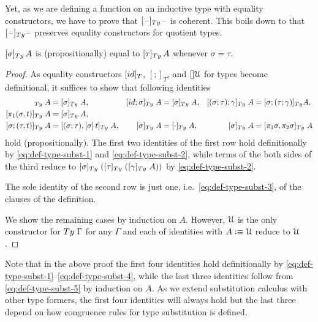 \documentclass[a4paper,UKenglish,numberwithinsect,cleveref,thm-restate]{lipics-v2021}
\newcommand{\danger}{\marginpar[\hfill\dbend]{\dbend\hfill}}
\newcommand{\LT}[2][]{\todo[inline,author={L-T},caption={},#1]{#2}}
\begin{document}
Yet, as we are defining a function on an inductive type with equality constructors, we have to prove that $[\blank]_{\Ty}\blank$ is coherent.\LT{general condition?} 
This boils down to that $[\blank]_{\Ty}\blank$ preserves equality constructors for quotient types.
\begin{proposition}[Coherence]\label{prop:coherence-1}
  $[\sigma]_{\Ty}\,A$ is (propositionally) equal to $[\tau]_{\Ty}\,A$ whenever $\sigma = \tau$.
  \danger
\end{proposition}
\begin{proof}
  As equality constructors $[\idS]_T$, $[;]_T$, and $[]\mathcal{U}$ for types become definitional, it suffices to show that following identities
  \begin{align*}
    [\sigma;\idS]_{\Ty} \;A          & = [\sigma]_{\Ty}\;A,
                                     & [\idS;\sigma]_{\Ty} \;A          & = [\sigma]_{\Ty}\;A,
                                     & [(\sigma;\tau);\gamma]_{\Ty} \;A & = [\sigma; (\tau; \gamma)]_{\Ty}A, \\
    [\pi_1(\sigma, t)]_{\Ty}\;A      & = [\sigma]_{\Ty}\;A, \\
    [\sigma; (\tau, t)]_{\Ty} \;A    & = [(\sigma;\tau), [\sigma]\, t]_{\Ty}\;A,
                                     & [\sigma]_{\Ty} \;A               & = [\emptyctx]_{\Ty}\;A,
                                     & [\sigma]_{\Ty} \;A               & = [\pi_1\sigma, \pi_2\sigma]_{\Ty}\;A
  \end{align*}
  hold (propositionally).
  The first two identities of the first row hold definitionally by \eqref{eq:def-type-subst-1} and \eqref{eq:def-type-subst-2}, while terms of the both sides of the third reduce to $[\sigma]_{\Ty}\;([\tau]_{\Ty}\;([\gamma]_{\Ty}\;A))$ by \eqref{eq:def-type-subst-2}.

  The sole identity of the second row is just one, i.e.\ \eqref{eq:def-type-subst-3}, of the clauses of the definition.

  We show the remaining cases by induction on $A$.
  However, $\mathcal{U}$ is the only constructor for $\Ty\;\Gamma$ for any $\Gamma$ and each of identities with $A \vcentcolon\equiv \mathcal{U}$ reduce to $\mathcal{U}$.
\end{proof}
\begin{remark}\label{re:coherence-proof}
  Note that in the above proof the first four identities hold definitionally by \eqref{eq:def-type-subst-1}--\eqref{eq:def-type-subst-4}, while the last three identities follow from \eqref{eq:def-type-subst-5} by induction on $A$.
  As we extend substitution calculus with other type formers, the first four identities will always hold but the last three depend on how congruence rules for type substitution is defined.
\end{remark}
\end{document}
